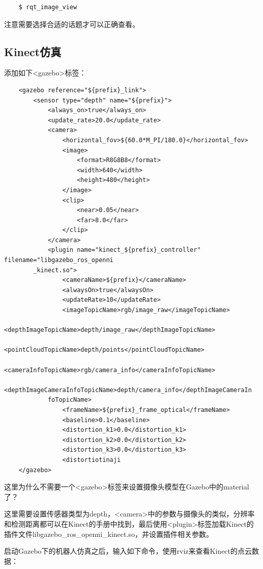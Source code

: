\documentclass[10pt, oneside]{book}
\begin{document}
\begin{verbatim}
    $ rqt_image_view
\end{verbatim}

注意需要选择合适的话题才可以正确查看。

\subsection{Kinect仿真}

添加如下<gazebo>标签：

\begin{verbatim}
    <gazebo reference="${prefix}_link">
        <sensor type="depth" name="${prefix}">
            <always_on>true</always_on>
            <update_rate>20.0</update_rate>
            <camera>
                <horizontal_fov>${60.0*M_PI/180.0}</horizontal_fov>
                <image>
                    <format>R8G8B8</format>
                    <width>640</width>
                    <height>480</height>
                </image>
                <clip>
                    <near>0.05</near>
                    <far>8.0</far>
                </clip>
            </camera>
            <plugin name="kinect_${prefix}_controller" filename="libgazebo_ros_openni
        _kinect.so">
                <cameraName>${prefix}</cameraName>
                <alwaysOn>true</alwaysOn>
                <updateRate>10</updateRate>
                <imageTopicName>rgb/image_raw</imageTopicName>
                <depthImageTopicName>depth/image_raw</depthImageTopicName>
                <pointCloudTopicName>depth/points</pointCloudTopicName>
                <cameraInfoTopicName>rgb/camera_info</cameraInfoTopicName>
                <depthImageCameraInfoTopicName>depth/camera_info</depthImageCameraIn
            foTopicName>
                <frameName>${prefix}_frame_optical</frameName>
                <baseline>0.1</baseline>
                <distortion_k1>0.0</distortion_k1>
                <distortion_k2>0.0</distortion_k2>
                <distortion_k3>0.0</distortion_k3>
                <distortiotinaji
    </gazebo>
\end{verbatim}

\textcolor[rgb]{1,0,0}{这里为什么不需要一个<gazebo>标签来设置摄像头模型在Gazebo中的material了？} 

这里需要设置传感器类型为depth，<camera>中的参数与摄像头的类似，分辨率和检测距离都可以在Kinect的手册中找到，最后使用<plugin>标签加载Kinect的插件文件libgazebo\_ros\_openni\_kinect.so，并设置插件相关参数。

启动Gazebo下的机器人仿真之后，输入如下命令，使用rviz来查看Kinect的点云数据：
\end{document}
